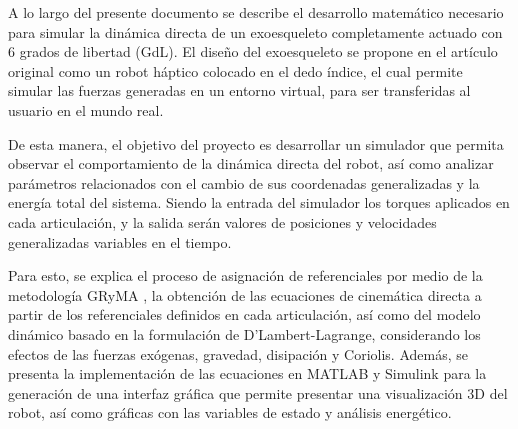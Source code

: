 \noindent A lo largo del presente documento se describe el desarrollo matemático necesario para 
simular la dinámica directa de un exoesqueleto completamente actuado con 6 grados de 
libertad (GdL). El diseño del exoesqueleto se propone en el artículo original \cite{hexotrac} como un robot háptico 
colocado en el dedo índice, el cual permite simular las fuerzas generadas en un entorno virtual, 
para ser transferidas al usuario en el mundo real. 

De esta manera, el objetivo del proyecto es  desarrollar un simulador 
que permita observar el comportamiento de la dinámica directa del robot, así como analizar parámetros 
relacionados con el cambio de sus coordenadas generalizadas y la energía total del sistema. Siendo la entrada del simulador los
torques aplicados en cada articulación, y la salida serán valores de posiciones y velocidades generalizadas variables en el tiempo.

Para esto, se explica el proceso de asignación de referenciales por medio de la metodología GRyMA \cite{rigid_multibody},
la obtención de las ecuaciones de cinemática directa a partir de los referenciales definidos en cada articulación, 
así como del modelo dinámico basado en la formulación de D'Lambert-Lagrange, considerando 
los efectos de las fuerzas exógenas, gravedad, disipación y Coriolis. Además, se presenta la implementación de las 
ecuaciones en MATLAB y Simulink para la generación de una interfaz gráfica que permite presentar una visualización 
3D del robot, así como gráficas con las variables de estado y análisis energético.